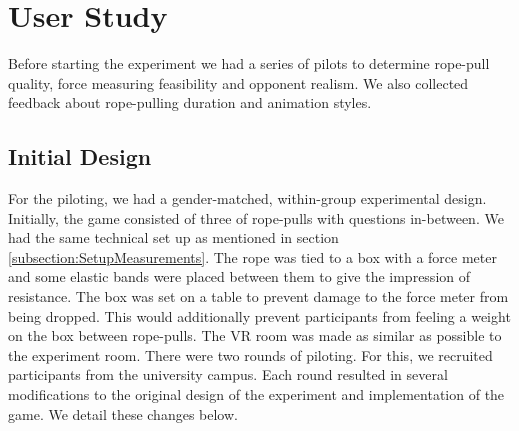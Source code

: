 
\section{User Study}
\label{subsection:initDesign}
Before starting the experiment we had a series of pilots to determine rope-pull quality, force measuring feasibility and opponent realism. We also collected feedback about rope-pulling duration and animation styles.
\subsection{Initial Design}
For the piloting, we had a gender-matched, within-group experimental design. Initially, the game consisted of three of rope-pulls with questions in-between. We had the same technical set up as mentioned in section \ref{subsection:SetupMeasurements}. The rope was tied to a box with a force meter and some elastic bands were placed between them to give the impression of resistance. The box was set on a table to prevent damage to the force meter from being dropped. This would additionally prevent participants from feeling a weight on the box between rope-pulls. The VR room was made as similar as possible to the experiment room. There were two rounds of piloting. For this, we recruited participants from the university campus. Each round resulted in several modifications to the original design of the experiment and implementation of the game. We detail these changes below.

